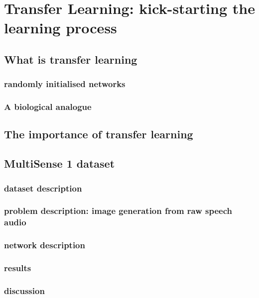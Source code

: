 
\chapter{Transfer Learning: kick-starting the learning process} %

\label{Chapter6} %


\section{What is transfer learning}
\subsection{randomly initialised networks}
\label{sec:random_init}

\subsection{A biological analogue}

\section{The importance of transfer learning}
\section{MultiSense 1 dataset}
\subsection{dataset description}
\subsection{problem description: image generation from raw speech audio}
\subsection{network description}
\subsection{results}
\subsection{discussion}